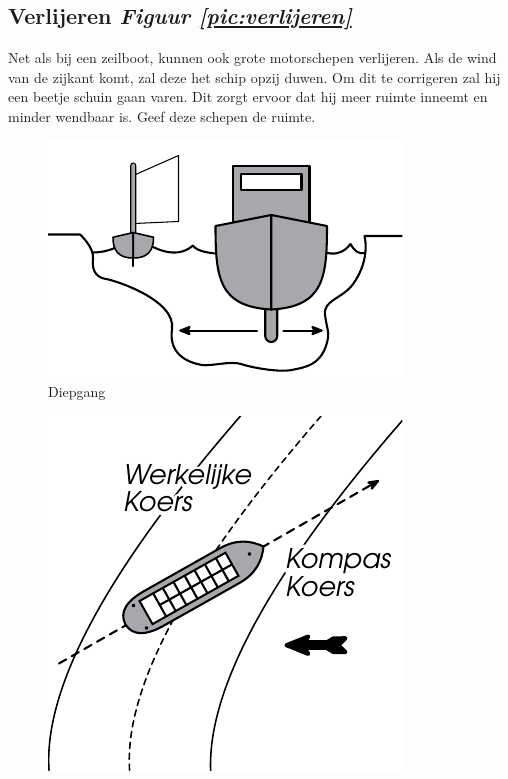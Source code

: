 \subsection{Verlijeren  \hfill \textit{Figuur \ref{pic:verlijeren}}}
Net als bij een zeilboot, kunnen ook grote motorschepen verlijeren. Als de wind van de zijkant komt, zal deze het schip opzij duwen. Om dit te corrigeren zal hij een beetje schuin gaan varen. Dit zorgt ervoor dat hij meer ruimte inneemt en minder wendbaar is. Geef deze schepen de ruimte. 

  \begin{center}
  \begin{minipage}[b]{0.30\textwidth}
    \begin{figure}[H]
        \includegraphics[width=\textwidth]{Hoofdstukken/Veiligheid/pdf/diepgang.pdf}
        \caption{Diepgang}
        \label{pic:diepgang}
    \end{figure}
  \end{minipage}
    \hspace{2cm}
  \begin{minipage}[b]{0.25\textwidth}
  \begin{figure}[H]
        \includegraphics[width=\textwidth]{Hoofdstukken/Veiligheid/pdf/verlijeren.pdf}

\end{figure}
\end{minipage}
\end{center}
